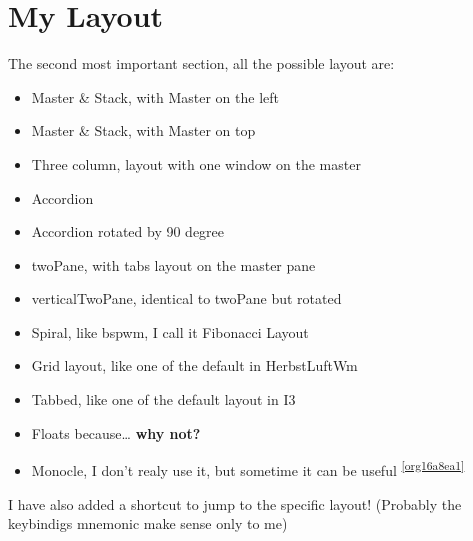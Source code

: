 \documentclass[11pt]{article}
\begin{document}
\section{My Layout}
\label{sec:org326509d}
The second most important section, all the possible layout are:
\begin{itemize}
\item Master \& Stack, with Master on the left
\item Master \& Stack, with Master on top
\item Three column, layout with one window on the master
\item Accordion
\item Accordion rotated by 90 degree
\item twoPane, with tabs layout on the master pane
\item verticalTwoPane, identical to twoPane but rotated
\item Spiral, like bspwm, I call it Fibonacci Layout
\item Grid layout, like one of the default in HerbstLuftWm
\item Tabbed, like one of the default layout in I3
\item Floats because\ldots{} \textbf{why not?}
\item Monocle, I don't realy use it, but sometime it can be useful \textsuperscript{\ref{org16a8ea1}}
\end{itemize}
I have also added a shortcut to jump to the specific layout! (Probably the keybindigs mnemonic make sense only to me)
\end{document}
